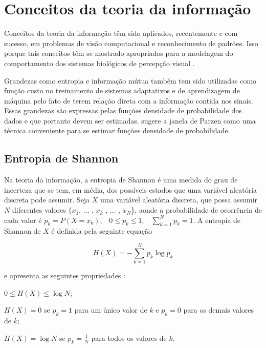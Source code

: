 \section{Conceitos da teoria da informação}

Conceitos da teoria da informação têm sido aplicados, recentemente e com sucesso, em problemas de visão computacional e reconhecimento de padrões. Isso porque tais conceitos têm se mostrado apropriados para a modelagem do comportamento dos sistemas biológicos de percepção visual \cite{Escolano:2009}.

Grandezas como entropia e informação mútua também tem sido utilizadas como função custo no treinamento de sistemas adaptativos e de aprendizagem de máquina \cite{Principe:2011} pelo fato de terem relação direta com a informação contida nos sinais. Essas grandezas são expressas pelas funções densidade de probabilidade dos dados e que portanto devem ser estimadas.  sugere a janela de Parzen \cite{Webb:2002} como uma técnica conveniente para se estimar funções densidade de probabilidade. 



\subsection{Entropia de Shannon}

Na teoria da informação, a entropia de Shannon é uma medida do grau de incerteza que se tem, em média, dos possíveis estados que uma variável aleatória discreta pode assumir. Seja  $X$ uma variável aleatória discreta, que possa assumir $N$ diferentes valores $\{x_1\text{, } \ldots\text{ , }x_k\text{ , }\ldots\text{ , }x_N$\}, aonde a probabilidade de ocorrência de cada valor é $p_k = P(X = x_k) \text{,} \quad 0 \leq p_k \leq 1 \text{,} \quad \sum \limits_{k=1}^N p_k = 1$. A entropia de Shannon de $X$ é definida pela seguinte equação 

\begin{equation}\label{eq:Shannon}
H(X) = -\sum\limits_{k = 1}^N p_k\log{p_k}
\end{equation}

e apresenta as seguintes propriedades \cite{Thomas:2006}:

\begin{alineas}
\item $0 \leq H(X) \leq \log{N}$;  
\item $H(X) = 0$ se $p_k = 1$ para um único valor de $k$ e $p_k = 0$ para os demais valores de $k$;
\item $H(X) = \log{N}$ se $p_k = \frac{1}{N}$ para todos os valores de $k$.
\end{alineas}

